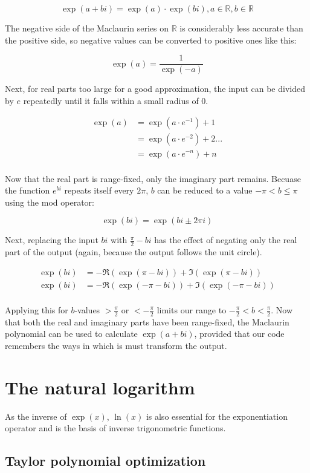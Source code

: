\documentclass[10pt]{article}
\begin{document}
\begin{multicols}{2}
\[
    \exp(a+bi) = \exp(a) · \exp(bi), a∈ℝ, b∈ℝ
\]

The negative side of the Maclaurin series on $ℝ$ is considerably less accurate than the positive side, so negative values can be converted to positive ones like this:

\[
    \exp(a) = \frac{1}{\exp(-a)}
\]

Next, for real parts too large for a good approximation, the input can be divided by $e$ repeatedly until it falls within a small radius of 0.

\begin{align*}
    \exp(a) &= \exp(a · e^{-1}) + 1 \\
    &= \exp(a · e^{-2}) + 2 ... \\
    &= \exp(a · e^{-n}) + n \\
\end{align*}

Now that the real part is range-fixed, only the imaginary part remains. Becuase the function $e^{bi}$ repeats itself every $2π$, $b$ can be reduced to a value $-π < b ≤ π$ using the mod operator:

\[
    \exp(bi) = \exp(bi ± 2πi)
\]

Next, replacing the input $bi$ with $\frac{π}{2} - bi$ has the effect of negating only the real part of the output (again, because the output follows the unit circle).

\begin{align*}
    \exp(bi) &= -\Re(\exp(π - bi)) + \Im(\exp(π - bi)) \\
    \exp(bi) &= -\Re(\exp(-π - bi)) + \Im(\exp(-π - bi)) \\
\end{align*}

Applying this for $b$-values $>\frac{π}{2}$ or $<-\frac{π}{2}$ limits our range to $-\frac{π}{2} < b < \frac{π}{2}$. Now that both the real and imaginary parts have been range-fixed, the Maclaurin polynomial can be used to calculate $\exp(a+bi)$, provided that our code remembers the ways in which is must transform the output.

\section{The natural logarithm}

As the inverse of $\exp(x)$, $\ln(x)$ is also essential for the exponentiation operator and is the basis of inverse trigonometric functions.

\subsection{Taylor polynomial optimization}


\end{multicols}
\end{document}
